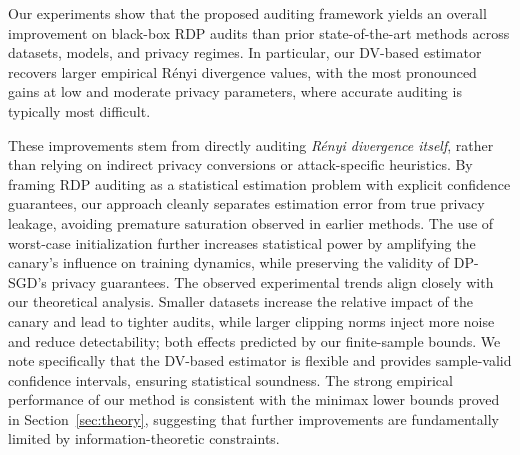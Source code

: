 \documentclass{article}
\theoremstyle{plain}
\theoremstyle{definition}
\theoremstyle{remark}
\begin{document}


Our experiments show that the proposed auditing framework yields an overall improvement on black-box RDP audits than prior state-of-the-art methods across datasets, models, and privacy regimes. In particular, our DV-based estimator
recovers larger empirical R\'enyi divergence values, with the most pronounced gains at low and moderate privacy parameters, where accurate auditing is typically most difficult.

These improvements stem from directly auditing \emph{R\'enyi divergence itself}, rather than relying on indirect privacy conversions or attack-specific heuristics. By framing RDP auditing as a statistical estimation problem with explicit confidence guarantees, our approach cleanly separates estimation error from true privacy leakage, avoiding premature saturation observed in earlier methods. The use of worst-case initialization further increases statistical power by amplifying the canary's influence on training dynamics, while preserving the validity of DP-SGD's privacy guarantees.
The observed experimental trends align closely with our theoretical analysis. Smaller datasets increase the relative impact of the canary and lead to tighter audits, while larger clipping norms inject more noise and reduce detectability; both effects predicted by our finite-sample bounds. 
We note specifically that the DV-based estimator is flexible
and provides sample-valid confidence intervals, ensuring statistical soundness.
The strong empirical performance of our method is consistent with the minimax lower bounds proved in Section~\ref{sec:theory}, suggesting that further improvements are fundamentally limited by information-theoretic constraints. 







\end{document}
